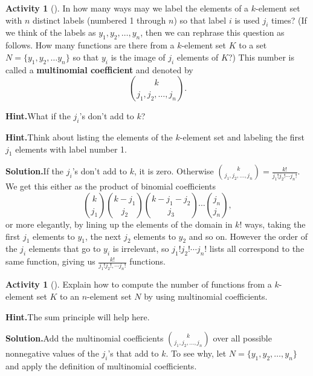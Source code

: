 \documentclass[10pt,]{book}
\newcommand{\terminology}[1]{\textbf{#1}}
\theoremstyle{plain}
\theoremstyle{definition}
\newtheorem{activity}[project]{Activity}
\numberwithin{equation}{chapter}
\begin{document}
\begin{activity}[]\label{activity-138}
In how many ways may we label the elements of a \(k\)-element set with \(n\) distinct labels (numbered 1 through \(n\)) so that label \(i\) is used \(j_i\) times? (If we think of the labels as \(y_1, y_2, \ldots, y_n\), then we can rephrase this question as follows.  How many functions are there from a \(k\)-element set \(K\) to a set \(N=\{y_1,y_2,\ldots y_n\}\) so that \(y_i\) is the image of \(j_i\) elements of \(K\)?) This number is called a \terminology{multinomial coefficient} and denoted by%
\begin{equation*}
\binom{k}{j_1,j_2,\ldots, j_n}.
\end{equation*}
%
\par\medskip\noindent%
\textbf{Hint.}\quad What if the \(j_i\)'s don’t add to \(k\)?%
\par\medskip\noindent%
\textbf{Hint.}\quad Think about listing the elements of the \(k\)-element set and labeling the first \(j_1\) elements with label number 1.%
\par\medskip\noindent%
\textbf{Solution.}\quad If the \(j_i\)'s don't add to \(k\), it is zero.  Otherwise \(\binom{k}{j_1,j_2,\ldots, j_n} =
\frac{k!}{j_1!j_2!\cdots j_n!}\). We get this either as the product of binomial coefficients%
\begin{equation*}
\binom{k}{j_1}\binom{k-j_1}{j_2}\binom{k-j_1-j_2}{j_3}\cdots\binom{j_n}{j_n},
\end{equation*}
or more elegantly, by lining up the elements of the domain in \(k!\) ways, taking the first \(j_1\) elements to \(y_1\), the next \(j_2\) elements to \(y_2\) and so on.  However the order of the \(j_i\) elements that go to \(y_i\) is irrelevant, so \(j_1!j_2!\cdots j_n!\) lists all correspond to the same function, giving us \(\frac{k!}{j_1!j_2!,\cdots j_n!}\) functions.%
\end{activity}
\begin{activity}[]\label{activity-139}
Explain how to compute the number of functions from a \(k\)-element set \(K\) to an \(n\)-element set \(N\) by using multinomial coefficients.%
\par\medskip\noindent%
\textbf{Hint.}\quad The sum principle will help here.%
\par\medskip\noindent%
\textbf{Solution.}\quad Add the multinomial coefficients \(\binom{k}{j_1,j_2,\ldots,j_n}\) over all possible nonnegative values of the \(j_i\)'s that add to \(k\).  To see why, let \(N=\{y_1,y_2,\ldots,y_n\}\) and apply the definition of multinomial coefficients.%
\end{activity}
\end{document}
